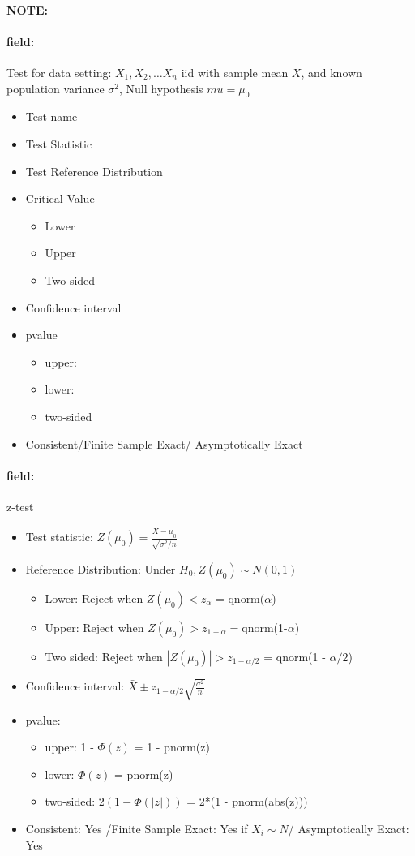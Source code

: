 \documentclass[12pt]{article}
\newenvironment{note}{\paragraph{NOTE:}}{}
\newenvironment{field}{\paragraph{field:}}{}
\begin{document}
\begin{note}
 \begin{field}
  Test for data setting: $X_1, X_2, \ldots X_n$ iid with sample mean $\bar{X}$, and known population variance $\sigma^2$, Null hypothesis $mu = \mu_0$

  \begin{itemize}
   \item Test name
   \item Test Statistic
   \item Test Reference Distribution
   \item Critical Value
         \begin{itemize}
          \item Lower
          \item Upper
          \item Two sided
         \end{itemize}
   \item Confidence interval
   \item pvalue
         \begin{itemize}
          \item upper:
          \item lower:
          \item two-sided
         \end{itemize}
   \item Consistent/Finite Sample Exact/ Asymptotically Exact
  \end{itemize}
 \end{field}
 \begin{field}
  z-test
  \begin{itemize}
   \item Test statistic: $Z(\mu_0) = \frac{\bar{X} - \mu_0}{\sqrt{\sigma^2/n}}$
   \item Reference Distribution: Under $H_0, Z(\mu_0) \sim N(0,1)$
         \begin{itemize}
          \item Lower: Reject when $Z(\mu_0) < z_{\alpha}$ = qnorm($\alpha$)
          \item Upper: Reject when $Z(\mu_0) > z_{1 - \alpha} = $qnorm(1-$\alpha$)
          \item Two sided:  Reject when $|Z(\mu_0)| > z_{1 - \alpha/2}$ = qnorm(1 - $\alpha/2$)
         \end{itemize}
   \item Confidence interval: $ \bar{X} \pm z_{1 - \alpha/2}\sqrt{\frac{\sigma^2}{n}}$
   \item pvalue:
         \begin{itemize}
          \item upper: 1 - $\Phi(z)$ = 1 - pnorm(z)
          \item lower: $\Phi(z)$ = pnorm(z)
          \item two-sided: $2(1 - \Phi(|z|))$ = 2*(1 - pnorm(abs(z)))
         \end{itemize}
   \item Consistent: Yes /Finite Sample Exact: Yes if $X_i \sim N$/ Asymptotically Exact: Yes
  \end{itemize}
 \end{field}
\end{note}
\end{document}
